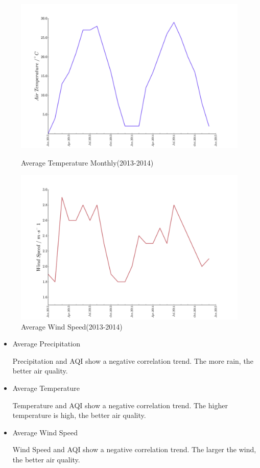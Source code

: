 \documentclass[a4paper,11pt]{article}
\begin{document}
\begin{figure}[h]
  \centering %
  \begin{minipage}[t]{.4\linewidth}
  \includegraphics[width=1\textwidth]{./Pic/tp.png}
  \caption{Average Temperature Monthly(2013-2014)}
  \label{fig:tp}
  \end{minipage}
  \begin{minipage}[t]{.4\linewidth}
  
  \includegraphics[width=1\textwidth]{./Pic/wind.png}
  \caption{Average Wind Speed(2013-2014)}
  \label{fig:wind}
  \end{minipage}
\end{figure}



\begin{itemize}
\item Average Precipitation
\par Precipitation and AQI show a negative correlation trend. The more rain, the better air quality.
\item Average Temperature
\par Temperature and AQI show a negative correlation trend. The higher temperature is high, the better air quality.
\item Average Wind Speed
\par Wind Speed and AQI show a negative correlation trend. The larger the wind, the better air quality.
\end{itemize}
\end{document}
